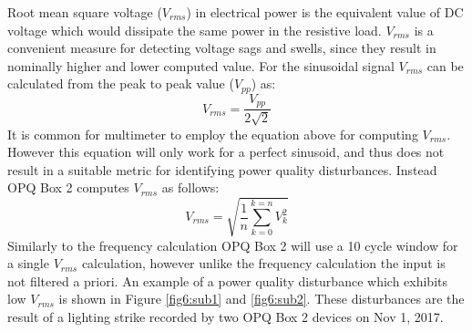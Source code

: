 Root mean square voltage ($V_{rms}$) in electrical power is the equivalent value of DC voltage which would dissipate the same power in the resistive load. $V_{rms}$ is a convenient measure for detecting voltage sags and swells, since they result in nominally higher and lower computed value. For the sinusoidal signal $V_{rms}$ can be calculated from the peak to peak value ($V_{pp}$) as:
\begin{equation} \label{eq:2}
	V_{rms} = \frac{V_{pp}}{2\sqrt{2}}
\end{equation}
It is common for multimeter to employ the equation above for computing $V_{rms}$. However this equation will only work for a perfect sinusoid, and thus does not result in a suitable metric for identifying power quality disturbances. Instead OPQ Box 2 computes $V_{rms}$ as follows:
\begin{equation} \label{eq:3}
	V_{rms} = \sqrt{\frac{1}{n}\sum\limits_{k=0}^{k=n}V_{k}^{2}}
\end{equation}
Similarly to the frequency calculation OPQ Box 2 will use a 10 cycle window for a single $V_{rms}$ calculation, however unlike the frequency calculation the input is not filtered a priori. An example of a power quality disturbance which exhibits low $V_{rms}$ is shown in Figure \ref{fig6:sub1} and \ref{fig6:sub2}. These disturbances are the result of a lighting strike recorded by two OPQ Box 2 devices on Nov 1, 2017.

